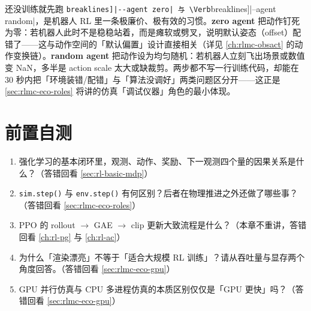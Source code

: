 \begin{insight}\label{ins:rlmc-eco-zerorandom}
还没训练就先跑 \Verb[breaklines]|--agent zero| 与 \Verb[breaklines]|--agent random|，是机器人 RL 里一条极廉价、极有效的习惯。\textbf{zero agent} 把动作钉死为零：若机器人此时不是稳稳站着，而是瘫软或劈叉，说明默认姿态（offset）配错了——这与动作空间的「默认偏置」设计直接相关（详见 \cref{ch:rlmc-obsact} 的动作变换链）。\textbf{random agent} 把动作设为均匀随机：若机器人立刻飞出场景或数值变 NaN，多半是 action scale 太大或缺裁剪。两步都不写一行训练代码，却能在 30 秒内把「环境装错/配错」与「算法没调好」两类问题区分开——这正是 \cref{sec:rlmc-eco-roles} 将讲的仿真「调试仪器」角色的最小体现。
\end{insight}

\section*{前置自测}
\label{sec:rlmc-eco-selftest}

\begin{practice}
\begin{enumerate}
  \item 强化学习的基本闭环里，观测、动作、奖励、下一观测四个量的因果关系是什么？（答错回看 \cref{sec:rl-basic-mdp}）
  \item \verb|sim.step()| 与 \verb|env.step()| 有何区别？后者在物理推进之外还做了哪些事？（答错回看 \cref{sec:rlmc-eco-roles}）
  \item PPO 的 rollout $\to$ GAE $\to$ clip 更新大致流程是什么？（本章不重讲，答错回看 \cref{ch:rl-pg} 与 \cref{ch:rl-ac}）
  \item 为什么「渲染漂亮」不等于「适合大规模 RL 训练」？请从吞吐量与显存两个角度回答。（答错回看 \cref{sec:rlmc-eco-gpu}）
  \item GPU 并行仿真与 CPU 多进程仿真的本质区别仅仅是「GPU 更快」吗？（答错回看 \cref{sec:rlmc-eco-gpu}）
\end{enumerate}
\end{practice}

